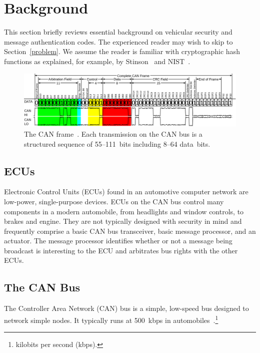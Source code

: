 \section{Background}
\label{background}

This section briefly reviews essential background on vehicular security and message authentication codes. 
The experienced reader may wish to skip to Section~\ref{problem}. 
We assume the reader is familiar with cryptographic hash functions as explained, for example, 
by Stinson~\cite{Stinson} and NIST~\cite{FIPS-180-4}.

	\begin{figure}
		\centering
		\includegraphics[width=\linewidth]{figures/can_frame.png}
		\caption{The CAN frame~\cite{fig1}.  
		Each transmission on the CAN bus is a structured sequence of 55--111~bits including 8--64 data~bits.}
		\label{fig-frame}
	\end{figure}

\subsection{ECUs}
\label{ecu}

Electronic Control Units (ECUs) found in an automotive computer network are low-power, single-purpose devices. ECUs on the CAN bus control many components in a modern automobile, from headlights and window controls, to brakes and engine. They are not typically designed with security in mind and frequently comprise a basic CAN bus transceiver, basic message processor, and an actuator. The message processor identifies whether or not a message being broadcast is interesting to the ECU and arbitrates bus rights with the other ECUs. 


\subsection{The CAN Bus}
\label{can}

The Controller Area Network (CAN) bus 
is a simple, low-speed bus designed to network simple nodes. 
It typically runs at 500~kbps in automobiles~\cite{canbus}.\footnote{kilobits per second (kbps).}

